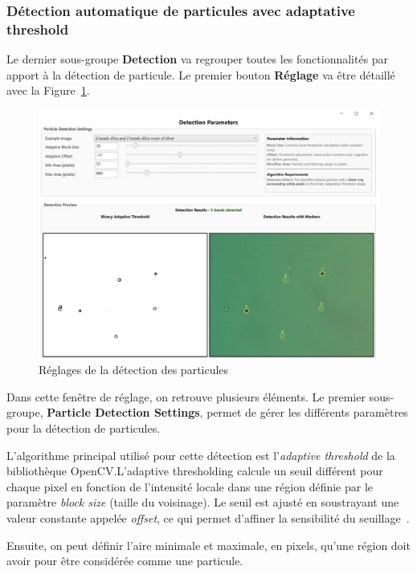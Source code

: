 \vspace{5em}
\subsubsection{Détection automatique de particules avec adaptative threshold}
Le dernier sous-groupe \textbf{Detection} va regrouper toutes les fonctionnalités par apport à la détection de particule. Le premier bouton \textbf{Réglage} va être détaillé avec la Figure~\ref{Settings_Detection}.
\newpage
\begin{figure}[H]
    \centering
    \includegraphics[width=\textwidth]{assets/figures/Application_ServoVision/Settings_Detection.jpeg}
    \caption{Réglages de la détection des particules}
    \label{Settings_Detection}
\end{figure}
Dans cette fenêtre de réglage, on retrouve plusieurs éléments. Le premier sous-groupe, \textbf{Particle Detection Settings}, permet de gérer les différents paramètres pour la détection de particules.

L'algorithme principal utilisé pour cette détection est l'\textit{adaptive threshold} de la bibliothèque OpenCV.L'adaptive thresholding calcule un seuil différent pour chaque pixel en fonction de l'intensité locale dans une région définie par le paramètre  \textit{block size} (taille du voisinage). Le seuil est ajusté en soustrayant une valeur constante appelée \textit{offset}, ce qui permet d'affiner la sensibilité du seuillage~\cite{OpenCVadaptativeThreshold}.

Ensuite, on peut définir l'aire minimale et maximale, en pixels, qu'une région doit avoir pour être considérée comme une particule.


